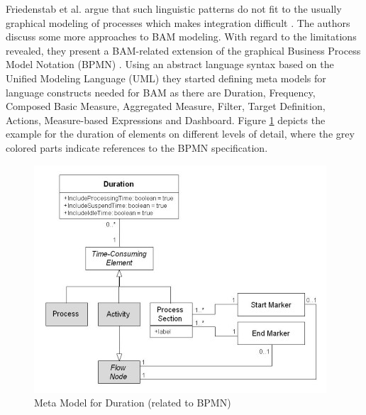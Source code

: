 Friedenstab et al. argue that such linguistic patterns do not fit to the usually graphical modeling of processes which makes integration difficult \cite{article:BPMNActivityMon}. The authors discuss some more approaches to BAM modeling. With regard to the limitations revealed, they present a BAM-related extension of the graphical Business Process Model Notation (BPMN) \cite{article:BPMNActivityMon}.
Using an abstract language syntax based on the Unified Modeling Language (UML) they started defining meta models for language constructs needed for BAM as there are Duration, Frequency, Composed Basic Measure, Aggregated Measure, Filter, Target Definition, Actions, Measure-based Expressions and Dashboard. Figure \ref{fig:Meta-Model} depicts the example for the duration of elements on different levels of detail, where the grey colored parts indicate references to the BPMN specification.

\begin{figure}[htbp]
	\centering
	\includegraphics[width=0.9\linewidth]{Figures/Chapter5/Monitoring/Meta-Mode-fo-Duration-relate-to-BPMN-1.jpg}
	\caption[Meta Model for Duration (related to BPMN) 12]{Meta Model for Duration (related to BPMN) \cite{article:BPMNActivityMon}}
	\label{fig:Meta-Model}
\end{figure}


